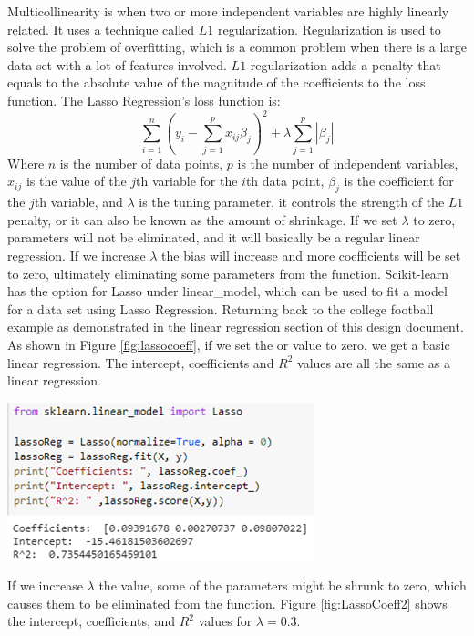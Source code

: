 \documentclass[a4paper,12pt]{report}
\begin{document}
Multicollinearity is when two or more independent variables are highly linearly related. It uses a technique called $L1$ regularization. Regularization is used to solve the problem of overfitting, which is a common problem when there is a large data set with a lot of features involved. $L1$ regularization adds a penalty that equals to the absolute value of the magnitude of the coefficients to the loss function. The Lasso Regression’s loss function is:
$$\sum_{i=1}^n\left(y_i-\sum_{j=1}^px_{ij}\beta_j\right)^2+\lambda\sum_{j=1}^p|\beta_j|$$
Where $n$ is the number of data points, $p$ is the number of independent variables, $x_{ij}$ is the value of the $j$th variable for the $i$th data point, $\beta_j$ is the coefficient for the $j$th variable, and $\lambda$ is the tuning parameter, it controls the strength of the $L1$ penalty, or it can also be known as the amount of shrinkage. If we set $\lambda$ to zero, parameters will not be eliminated, and it will basically be a regular linear regression. If we increase $\lambda$ the bias will increase and more coefficients will be set to zero, ultimately eliminating some parameters from the function. Scikit-learn has the option for Lasso under linear\_model, which can be used to fit a model for a data set using Lasso Regression. Returning back to the college football example as demonstrated in the linear regression section of this design document. As shown in Figure \ref{fig:lassocoeff}, if we set the or value to zero, we get a basic linear regression. The intercept, coefficients and $R^2$ values are all the same as a linear regression. 

\begin{center}
    \captionsetup{type=figure}
    \includegraphics[width=.9\linewidth]{media/lassocoeff.png}
    \label{fig:lassocoeff}
\end{center}

If we increase $\lambda$ the value, some of the parameters might be shrunk to zero, which causes them to be eliminated from the function. Figure \ref{fig:LassoCoeff2} shows the intercept, coefficients, and $R^2$ values for $\lambda=0.3$.
\end{document}
